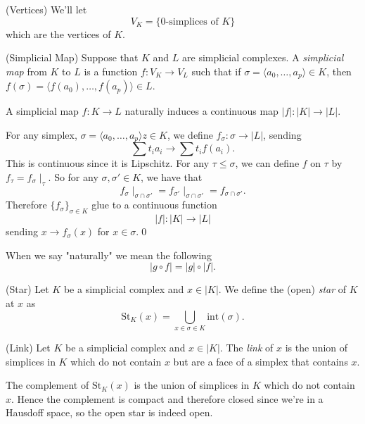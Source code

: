 \documentclass{article}
\begin{document}
\begin{definition}
	(Vertices) We'll let
	\[
		V_K = \{0\text{-simplices of } K\}
	\]
	which are the vertices of $ K $.
\end{definition}
\begin{definition}
(Simplicial Map) Suppose that $ K $ and $ L $ are simplicial complexes. A \textit{simplicial map} from $ K $ to $ L $ is a function $ f:V_K \to V_L $ such that if $ \sigma = \langle a_0,\dots, a_p\rangle \in K $, then $f(\sigma) = \langle f(a_0),\dots, f(a_p)\rangle \in L $. 
\end{definition}
\begin{lemma}
  A simplicial map $ f: K \to L $ naturally induces a continuous map $ |f|: |K|\to |L| $.
\end{lemma}
\pf For any simplex, $ \sigma = \langle a_0,\dots, a_p\rangle z\in K $, we define $ f_\sigma : \sigma \to |L| $, sending 
\[
  \sum t_ia_i \to \sum t_if(a_i).
\]
This is continuous since it is Lipschitz. For any $ \tau\le \sigma $, we can define $ f $ on $ \tau $ by $ f_\tau = f_\sigma\mid_\tau $. So for any $ \sigma,\sigma' \in K $, we have that 
\[
	f_\sigma\mid_{\sigma\cap \sigma'} = f_{\sigma'}\mid_{\sigma\cap \sigma'} = f_{\sigma \cap \sigma'}.
\]
Therefore $ \{f_\sigma\}_{\sigma\in K} $ glue to a continuous function
\[
  |f|: |K| \to |L|
\]
sending $ x\to f_\sigma(x) $ for $ x\in \sigma $.\qed\par
When we say "naturally" we mean the following 
\[
  |g\circ f| = |g| \circ |f|.
\]
\begin{definition}
	(Star) Let $ K $ be a simplicial complex and $ x\in |K| $. We define the (open) \textit{star} of $ K $ at $ x $ as
	\[
		\mathrm{St}_K(x) = \bigcup_{x\in \sigma\in K}\mathrm{int}(\sigma).
	\]
\end{definition}
\begin{definition}
	(Link) Let $ K $ be a simplicial complex and $ x\in |K| $. The \textit{link} of $ x $ is the union of simplices in $ K $ which do not contain $ x $ but are a face of a simplex that contains $ x $.
\end{definition}
\begin{remark}
	The complement of $ \mathrm{St}_K(x) $ is the union of simplices in $ K $ which do not contain $ x $. Hence the complement is compact and therefore closed since we're in a Hausdoff space, so the open star is indeed open.
\end{remark}
\end{document}
